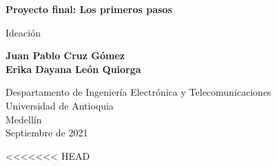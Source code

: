 \documentclass{article}
\begin{document}
\begin{titlepage}
    \begin{center}
        \vspace*{1cm}
            
        \Huge
        \textbf{Proyecto final: Los primeros pasos}
            
        \vspace{0.5cm}
        \LARGE
        Ideación
            
        \vspace{1.5cm}
            
        \textbf{Juan Pablo Cruz Gómez\\
                Erika Dayana León Quiorga}
            
        \vfill
            
        \vspace{0.8cm}
            
        \Large
        Despartamento de Ingeniería Electrónica y Telecomunicaciones\\
        Universidad de Antioquia\\
        Medellín\\
        Septiembre de 2021
            
    \end{center}
\end{titlepage}

\tableofcontents
\newpage
<<<<<<< HEAD
\end{document}
